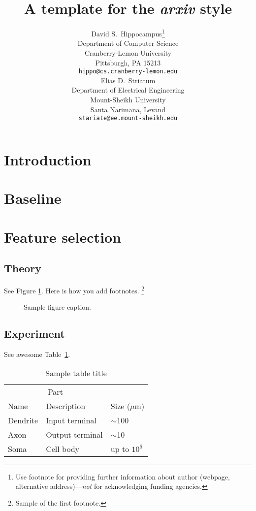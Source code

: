 \documentclass{article}
\title{A template for the \emph{arxiv} style}
\author{
  David S.~Hippocampus\thanks{Use footnote for providing further
    information about author (webpage, alternative
    address)---\emph{not} for acknowledging funding agencies.} \\
  Department of Computer Science\\
  Cranberry-Lemon University\\
  Pittsburgh, PA 15213 \\
  \texttt{hippo@cs.cranberry-lemon.edu} \\
   \And
 Elias D.~Striatum \\
  Department of Electrical Engineering\\
  Mount-Sheikh University\\
  Santa Narimana, Levand \\
  \texttt{stariate@ee.mount-sheikh.edu} \\
}
\begin{document}
\maketitle

\begin{abstract}
\lipsum[1]
\end{abstract}




\section{Introduction}
\lipsum[2]
\lipsum[3]


\section{Baseline}
\label{sec:baseline}

\paragraph{}
\lipsum[7]

\section{Feature selection}
\label{sec:selection}

\subsection{Theory}
\lipsum[10] 
See Figure \ref{fig:fig1}. Here is how you add footnotes. \footnote{Sample of the first footnote.}
\lipsum[11] 

\begin{figure}
  \centering
  \fbox{\rule[-.5cm]{4cm}{4cm} \rule[-.5cm]{4cm}{0cm}}
  \caption{Sample figure caption.}
  \label{fig:fig1}
\end{figure}

\subsection{Experiment}
\lipsum[12]
See awesome Table~\ref{tab:table}.

\begin{table}
 \caption{Sample table title}
  \centering
  \begin{tabular}{lll}
    \toprule
    \multicolumn{2}{c}{Part}                   \\
    \cmidrule(r){1-2}
    Name     & Description     & Size ($\mu$m) \\
    \midrule
    Dendrite & Input terminal  & $\sim$100     \\
    Axon     & Output terminal & $\sim$10      \\
    Soma     & Cell body       & up to $10^6$  \\
    \bottomrule
  \end{tabular}
  \label{tab:table}
\end{table}
\end{document}
